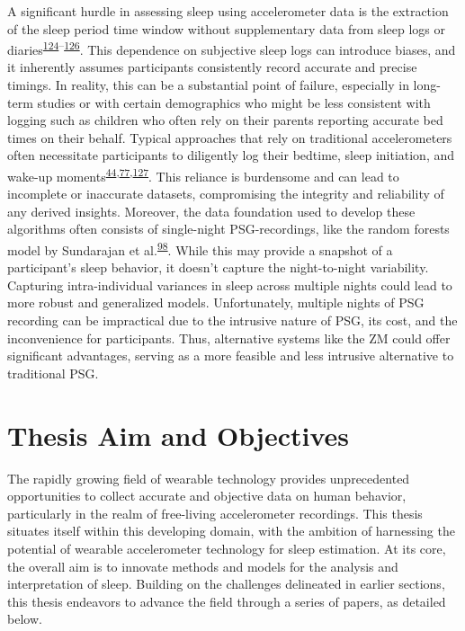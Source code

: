 \documentclass[
  10pt,
]{scrbook}
\begin{document}
A significant hurdle in assessing sleep using accelerometer data is the
extraction of the sleep period time window without supplementary data
from sleep logs or
diaries\textsuperscript{\protect\hyperlink{ref-doherty_large_2017}{124}--\protect\hyperlink{ref-anderson_assessment_2014}{126}}.
This dependence on subjective sleep logs can introduce biases, and it
inherently assumes participants consistently record accurate and precise
timings. In reality, this can be a substantial point of failure,
especially in long-term studies or with certain demographics who might
be less consistent with logging such as children who often rely on their
parents reporting accurate bed times on their behalf. Typical approaches
that rely on traditional accelerometers often necessitate participants
to diligently log their bedtime, sleep initiation, and wake-up
moments\textsuperscript{\protect\hyperlink{ref-girschik_validation_2012}{44},\protect\hyperlink{ref-littner_2003}{77},\protect\hyperlink{ref-lockley_1999}{127}}.
This reliance is burdensome and can lead to incomplete or inaccurate
datasets, compromising the integrity and reliability of any derived
insights. Moreover, the data foundation used to develop these algorithms
often consists of single-night PSG-recordings, like the random forests
model by Sundarajan et
al.\textsuperscript{\protect\hyperlink{ref-sundararajan_sleep_2021}{98}}.
While this may provide a snapshot of a participant's sleep behavior, it
doesn't capture the night-to-night variability. Capturing
intra-individual variances in sleep across multiple nights could lead to
more robust and generalized models. Unfortunately, multiple nights of
PSG recording can be impractical due to the intrusive nature of PSG, its
cost, and the inconvenience for participants. Thus, alternative systems
like the ZM could offer significant advantages, serving as a more
feasible and less intrusive alternative to traditional PSG.

\hypertarget{thesis-aim-and-objectives}{%
\section{Thesis Aim and Objectives}\label{thesis-aim-and-objectives}}

The rapidly growing field of wearable technology provides unprecedented
opportunities to collect accurate and objective data on human behavior,
particularly in the realm of free-living accelerometer recordings. This
thesis situates itself within this developing domain, with the ambition
of harnessing the potential of wearable accelerometer technology for
sleep estimation. At its core, the overall aim is to innovate methods
and models for the analysis and interpretation of sleep. Building on the
challenges delineated in earlier sections, this thesis endeavors to
advance the field through a series of papers, as detailed below.
\end{document}

